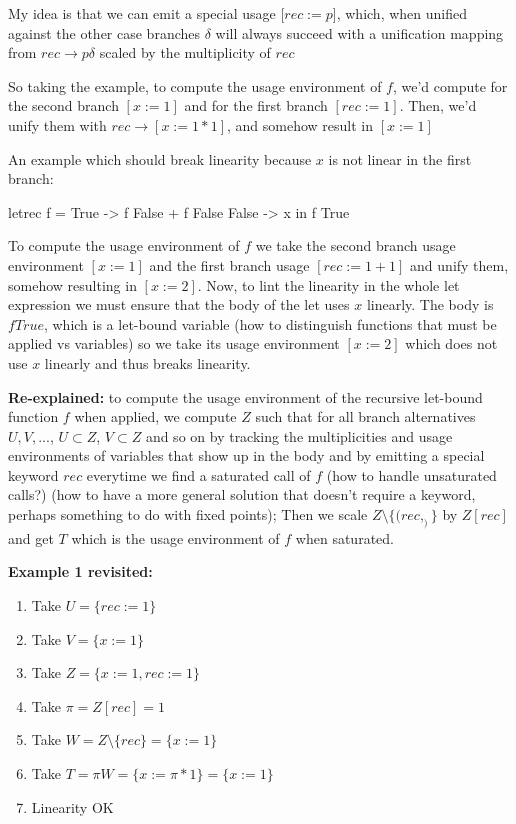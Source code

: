 \documentclass[a4paper, draft]{article}
\begin{document}
My idea is that we can emit a special usage [$rec := p$], which, when unified
against the other case branches $\delta$ will always succeed with a unification
mapping from $rec \rightarrow p\delta$ scaled by the multiplicity of $rec$

So taking the example, to compute the usage environment of $f$, we'd compute for
the second branch $[x := 1]$ and for the first branch $[rec := 1]$. Then, we'd
unify them with $rec \rightarrow [x := 1*1]$, and somehow result in $[x := 1]$

An example which should break linearity because $x$ is not linear in the first
branch:
\begin{code}
letrec f = \case
         True -> f False + f False
         False -> x
    in f True
\end{code}

To compute the usage environment of $f$ we take the second branch usage
environment $[x := 1]$ and the first branch usage $[rec := 1+1]$ and unify them,
somehow resulting in $[x := 2]$. Now, to lint the linearity in the whole let
expression we must ensure that the body of the let uses $x$ linearly. The body
is $f True$, which is a let-bound variable (how to distinguish functions that
must be applied vs variables) so we take its usage environment $[x := 2]$ which
does not use $x$ linearly and thus breaks linearity.

\textbf{Re-explained:} to compute the usage environment of the recursive
let-bound function $f$ when applied, we compute $Z$ such that for all branch
alternatives $U,V,...$, $U \subset Z$, $V \subset Z$ and so on by tracking the
multiplicities and usage environments of variables that show up in the body and
by emitting a special keyword $rec$ everytime we find a saturated call of $f$
(how to handle unsaturated calls?) (how to have a more general solution that
doesn't require a keyword, perhaps something to do with fixed points); Then we
scale $Z \setminus \{(rec,_)\}$ by $Z[rec]$ and get $T$ which is the usage
environment of $f$ when saturated.

\textbf{Example 1 revisited:}
\begin{enumerate}
    \item Take $U = \{rec := 1\}$
    \item Take $V = \{x := 1\}$
    \item Take $Z = \{x := 1, rec := 1\}$
    \item Take $\pi = Z[rec] = 1$
    \item Take $W = Z \setminus \{rec\} = \{x := 1\}$
    \item Take $T = \pi W = \{x := \pi * 1\} = \{x := 1\}$
    \item Linearity OK
\end{enumerate}
\end{document}
